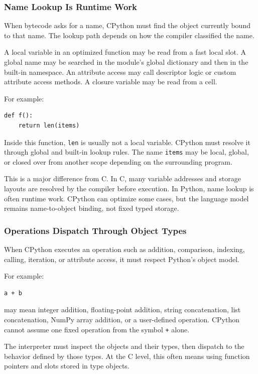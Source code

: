 \subsubsection{Name Lookup Is Runtime Work}

When bytecode asks for a name, CPython must find the object currently bound to that name. The lookup path depends on how the compiler classified the name.

A local variable in an optimized function may be read from a fast local slot. A global name may be searched in the module's global dictionary and then in the built-in namespace. An attribute access may call descriptor logic or custom attribute access methods. A closure variable may be read from a cell.

For example:

\begin{verbatim}
def f():
    return len(items)
\end{verbatim}

Inside this function, \texttt{len} is usually not a local variable. CPython must resolve it through global and built-in lookup rules. The name \texttt{items} may be local, global, or closed over from another scope depending on the surrounding program.

This is a major difference from C. In C, many variable addresses and storage layouts are resolved by the compiler before execution. In Python, name lookup is often runtime work. CPython can optimize some cases, but the language model remains name-to-object binding, not fixed typed storage.

\subsubsection{Operations Dispatch Through Object Types}

When CPython executes an operation such as addition, comparison, indexing, calling, iteration, or attribute access, it must respect Python's object model.

For example:

\begin{verbatim}
a + b
\end{verbatim}

may mean integer addition, floating-point addition, string concatenation, list concatenation, NumPy array addition, or a user-defined operation. CPython cannot assume one fixed operation from the symbol \texttt{+} alone.

The interpreter must inspect the objects and their types, then dispatch to the behavior defined by those types. At the C level, this often means using function pointers and slots stored in type objects.

